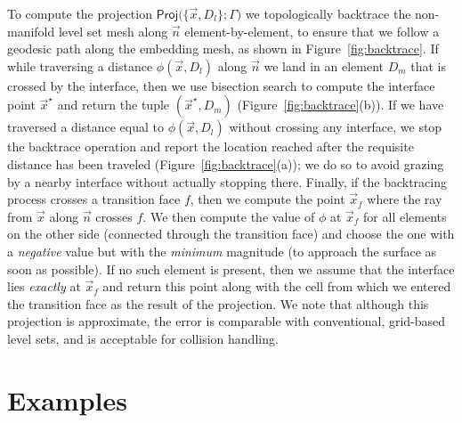 To compute the projection
$\textsf{Proj(}\{\vec{x},D_l\};\Gamma\textsf{)}$ we topologically
backtrace the non-manifold level set mesh along $\vec{n}$
element-by-element, to ensure that we follow a geodesic path along the
embedding mesh, as shown in Figure~\ref{fig:backtrace}. If while
traversing a distance $\phi(\vec{x},D_l)$ along $\vec{n}$ we land in
an element $D_m$ that is crossed by the interface, then we use
bisection search to compute the interface point $\vec{x}^\star$ and
return the tuple $(\vec{x}^\star,D_m)$
(Figure~\ref{fig:backtrace}(b)). If we have traversed a distance equal
to $\phi(\vec{x},D_l)$ without crossing any interface, we stop the
backtrace operation and report the location reached after the
requisite distance has been traveled (Figure~\ref{fig:backtrace}(a));
we do so to avoid grazing by a nearby interface without actually
stopping there. Finally, if the backtracing process crosses a
transition face $f$, then we compute the point $\vec{x}_f$ where the
ray from $\vec{x}$ along $\vec{n}$ crosses $f$. We then compute the
value of $\phi$ at $\vec{x}_f$ for all elements on the other side
(connected through the transition face) and choose the one with a
\emph{negative} value but with the \emph{minimum} magnitude (to
approach the surface as soon as possible). If no such element is
present, then we assume that the interface lies \emph{exactly} at
$\vec{x}_f$ and return this point along with the cell from which we
entered the transition face as the result of the projection. We note
that although this projection is approximate, the error is comparable
with conventional, grid-based level sets, and is acceptable for
collision handling.




\vspace*{-.02in}
\section{Examples}
\label{sec:examples}
\vspace*{-.03in}

